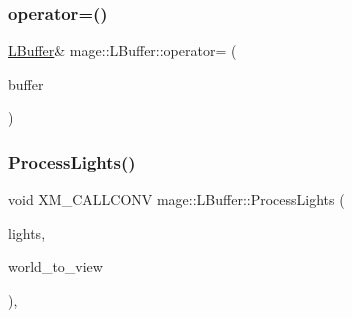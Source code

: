 \hypertarget{structmage_1_1_l_buffer_a215de33360d297c0c2793b238ee82131}{}\label{structmage_1_1_l_buffer_a215de33360d297c0c2793b238ee82131} 
\subsubsection{\texorpdfstring{operator=()}{operator=()}\hspace{0.1cm}{\footnotesize\ttfamily [2/2]}}
{\footnotesize\ttfamily \hyperlink{structmage_1_1_l_buffer}{L\+Buffer}\& mage\+::\+L\+Buffer\+::operator= (\begin{DoxyParamCaption}\item[{\hyperlink{structmage_1_1_l_buffer}{L\+Buffer} \&\&}]{buffer }\end{DoxyParamCaption})\hspace{0.3cm}{\ttfamily [delete]}}

\hypertarget{structmage_1_1_l_buffer_a39bbdefed2d1dffb8f1b29a0924f3daa}{}\label{structmage_1_1_l_buffer_a39bbdefed2d1dffb8f1b29a0924f3daa} 
\subsubsection{\texorpdfstring{Process\+Lights()}{ProcessLights()}\hspace{0.1cm}{\footnotesize\ttfamily [1/3]}}
{\footnotesize\ttfamily void X\+M\+\_\+\+C\+A\+L\+L\+C\+O\+NV mage\+::\+L\+Buffer\+::\+Process\+Lights (\begin{DoxyParamCaption}\item[{const vector$<$ const \hyperlink{namespacemage_a7637b5351fc0f66a10badd80ebb35899}{Directional\+Light\+Node} $\ast$ $>$ \&}]{lights,  }\item[{F\+X\+M\+M\+A\+T\+R\+IX}]{world\+\_\+to\+\_\+view }\end{DoxyParamCaption})\hspace{0.3cm}{\ttfamily [private]}, {\ttfamily [noexcept]}}

\hypertarget{structmage_1_1_l_buffer_a82879fbde4b5519031af9ffa13eb0e62}{}\label{structmage_1_1_l_buffer_a82879fbde4b5519031af9ffa13eb0e62} 
